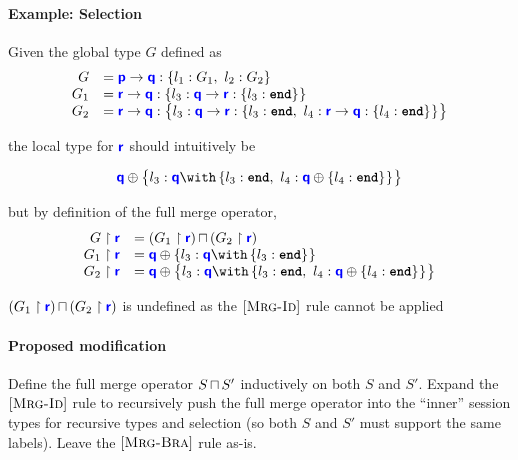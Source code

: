 \documentclass{article}
\begin{document}
\paragraph{Example: Selection}
Given the global type $G$ defined as
\[
\begin{array}{rl}
G &= {\color{blue}\bm{\mathsf{p}}} \to {\color{blue}\bm{\mathsf{q}}} : \left\{ {l_1: G_1,~l_2: G_2} \right\}_{} \\
G_1 &= {\color{blue}\bm{\mathsf{r}}} \to {\color{blue}\bm{\mathsf{q}}} : \left\{ {l_3: {\color{blue}\bm{\mathsf{q}}} \to {\color{blue}\bm{\mathsf{r}}} : \left\{ {l_3: \textbf{\texttt{end}}} \right\}_{}} \right\}_{} \\
G_2 &= {\color{blue}\bm{\mathsf{r}}} \to {\color{blue}\bm{\mathsf{q}}} : \left\{ {l_3: {\color{blue}\bm{\mathsf{q}}} \to {\color{blue}\bm{\mathsf{r}}} : \left\{ {l_3: \textbf{\texttt{end}},~l_4: {\color{blue}\bm{\mathsf{r}}} \to {\color{blue}\bm{\mathsf{q}}} : \left\{ {l_4: \textbf{\texttt{end}}} \right\}_{}} \right\}_{}} \right\}_{}
\end{array}
\]

the local type for ${\color{blue}\bm{\mathsf{r}}}$ should intuitively be

\[
\tysel{q}{l_3: \tybra{q}{l_3: \tyend,~l_4: \tysel{q}{l_4: \tyend}{}}{}}{}
\]

but by definition of the full merge operator,
\[
\begin{array}{rl}
\proj{G}{r} &= \tymerge{\left(\proj{G_1}{r}\right)}{\left(\proj{G_2}{r}\right)} \\
\proj{G_1}{r} &= \tysel{q}{l_3: \tybra{q}{l_3: \tyend}{}}{} \\
\proj{G_2}{r} &= \tysel{q}{l_3: \tybra{q}{l_3: \tyend,~l_4: \tysel{q}{l_4: \tyend}{}}{}}{}
\end{array}
\]

${\left({G_1} \upharpoonright {\color{blue}\bm{\mathsf{r}}}\right)}\,{\sqcap}\,{\left({G_2} \upharpoonright {\color{blue}\bm{\mathsf{r}}}\right)}$ is undefined as the $[\textsc{Mrg-Id}]$ rule
cannot be applied


\paragraph{Proposed modification} 
Define the full merge operator ${S}\,{\sqcap}\,{S'}$ inductively on
both $S$ and $S'$. Expand the $[\textsc{Mrg-Id}]$ rule
to recursively push the full merge operator into the
``inner'' session types for recursive types and selection
(so both $S$ and $S'$ must support the same labels). 
Leave the $[\textsc{Mrg-Bra}]$ rule as-is.
\end{document}
